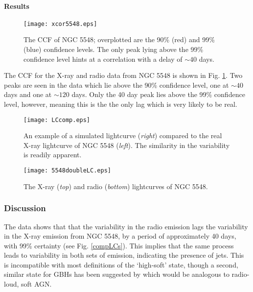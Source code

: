 \documentclass[letters,useAMS,usenatbib]{samnote}
\begin{document}
 
 
 \paragraph{Results}
 
 \begin{figure}
	\texttt{[image: xcor5548.eps]}

	\caption{The CCF of NGC 5548; overplotted are the 90\% (red) and 99\% (blue) confidence levels. The only peak
	lying above the 99\% confidence level hints at a correlation with a delay of $\sim 40$ days.}
	\label{xcor}
\end{figure}
 
The CCF for the X-ray and radio data from NGC 5548 is shown in Fig. \ref{xcor}. Two peaks are seen
in the data which lie above the 90\% confidence level, one at $\sim 40$ days and one at $\sim 120$ days. Only the 40 day peak lies above the 99\% confidence level,
however, meaning this is the the only lag which is very likely to be real. 
 
  \begin{figure}
	\texttt{[image: LCcomp.eps]}

	\caption{An example of a simulated lightcurve ({\it right}) compared to the real X-ray lightcurve of NGC 5548 ({\it left}). The similarity in the variability
is readily apparent.}
	\label{simlc}
\end{figure}
 
\begin{figure}
	
	\texttt{[image: 5548doubleLC.eps]}\hspace{1pt}
	\caption{The X-ray ({\it top}) and radio ({\it bottom}) lightcurves of NGC 5548.}
	
	\label{twoLCs}
\end{figure} 
 
 \subsubsection{Discussion}
 
The data shows that that the variability in the radio emission lags the variability in the X-ray emission from NGC 5548, by a period of
approximately 40 days, with 99\% certainty (see Fig. \ref{compLCs}). This implies that the same process leads to variability in both sets of emission, indicating the
presence of jets. This is incompatible with most definitions of the `high-soft' state, though a second, similar state for GBHs has been suggested by \citet{gallo12} which
would be analogous to radio-loud, soft AGN.
 
\end{document}
